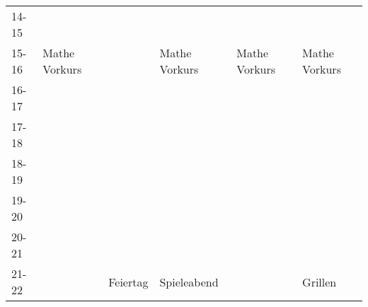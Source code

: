\begin{table}[!h]
\begin{tabular}{|l|p{}|p{}|p{}|p{}|p{}|}
	14-15 &                                 &                             &                                                       &                                 &                                                   \\ \cline{1-1}
	15-16 & \multirow{-7}{*}{\footnotesize{Mathe Vorkurs}} &                             & \multirow{-7}{*}{\footnotesize{Mathe Vorkurs}}                       & \multirow{-7}{*}{\footnotesize{Mathe Vorkurs}} & \multirow{-7}{*}{\footnotesize{Mathe Vorkurs}}                   \\ \cline{1-2} \cline{4-6} 
	16-17 &                                 &                             &                                                       &                                 &                                                   \\ \cline{1-2} \cline{4-6} 
	17-18 &                                 &                             &                                                       &                                 & \cellcolor[HTML]{EFEFEF}                          \\ \cline{1-2} \cline{4-5}
	18-19 &                                 &                             &                                                       &                                 & \cellcolor[HTML]{EFEFEF}                          \\ \cline{1-2} \cline{4-5}
	19-20 &                                 &                             & \cellcolor[HTML]{EFEFEF}                              &                                 & \cellcolor[HTML]{EFEFEF}                          \\ \cline{1-2} \cline{5-5}
	20-21 &                                 &                             & \cellcolor[HTML]{EFEFEF}                              &                                 & \cellcolor[HTML]{EFEFEF}                          \\ \cline{1-2} \cline{5-5}
	21-22 &                                 & \multirow{-14}{*}{\footnotesize{Feiertag}} & \multirow{-3}{*}{\cellcolor[HTML]{EFEFEF}\footnotesize{Spieleabend}} &                                 & \multirow{-5}{*}{\cellcolor[HTML]{EFEFEF}\footnotesize{Grillen}} \\ \hline
	\end{tabular}
	\end{table}


